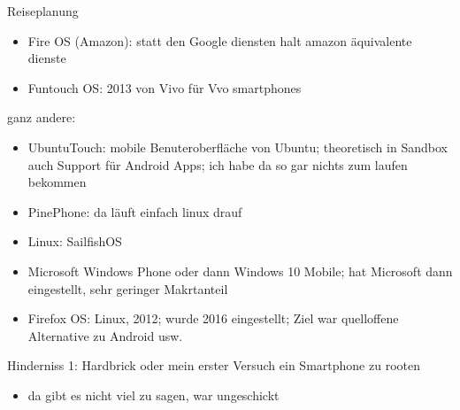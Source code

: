 \documentclass[14pt,compress,usenames,dvipsnames,aspectratio=169]{beamer}
\begin{document}
\begin{frame}{Reiseplanung}
{\begin{itemize}
            \item Fire OS (Amazon): statt den Google diensten halt amazon äquivalente dienste
            \item Funtouch OS: 2013 von Vivo für Vvo smartphones
        \end{itemize} 
        ganz andere:
        \begin{itemize}
            \item UbuntuTouch: mobile Benuteroberfläche von Ubuntu; theoretisch in Sandbox auch Support für Android Apps; ich habe da so gar nichts zum laufen bekommen
            \item PinePhone: da läuft einfach linux drauf
            \item Linux: SailfishOS
            \item Microsoft Windows Phone oder dann Windows 10 Mobile; hat Microsoft dann eingestellt, sehr geringer Makrtanteil
            \item Firefox OS: Linux, 2012; wurde 2016 eingestellt; Ziel war quelloffene Alternative zu Android usw.
        \end{itemize}        
    }

\end{frame}

\begin{frame}{Hinderniss 1: Hardbrick}
    oder mein erster Versuch ein Smartphone zu rooten
    \begin{itemize}
        \item da gibt es nicht viel zu sagen, war ungeschickt
    \end{itemize}

\end{frame}
\end{document}

